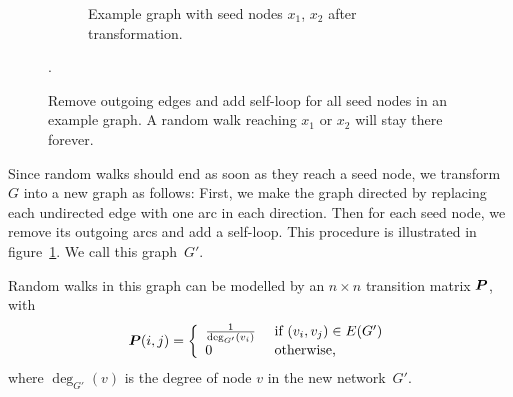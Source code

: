 \begin{figure}
\begin{subfigure}{\textwidth}
    \caption{Example graph with seed nodes $x_1$, $x_2$ after transformation.}
\end{subfigure}
\caption[Removal of outgoing edges of seed nodes in a graph]
{Remove outgoing edges and add self-loop for all seed nodes in an example graph. A random walk reaching $x_1$ or $x_2$ will stay there forever.}
\label{fig:modgraph}.
\end{figure}

Since random walks should end as soon as they reach a seed node, we transform $G$ into a new graph as follows:
First, we make the graph directed by replacing each undirected edge with one arc in each direction.
Then for each seed node, we remove its outgoing arcs and add a self-loop.
This procedure is illustrated in figure~\ref{fig:modgraph}.
We call this graph~$G'$.

Random walks in this graph can be modelled by an $n \times n$ transition matrix $\boldsymbol{P}$, with
\begin{equation}\label{eqn:defining_prob}
	\boldsymbol{P}(i, j) = \left \{ 
							\begin{array}{ll}
                                \frac{1}{\deg_{G'} (v_i)} & \mbox{ if } (v_i, v_j) \in E(G') \\
								0			& \mbox{ otherwise,}
							\end{array}
					\right.
\end{equation}
where $\deg_{G'} (v)$ is the degree of node $v$ in the new network~$G'$.

